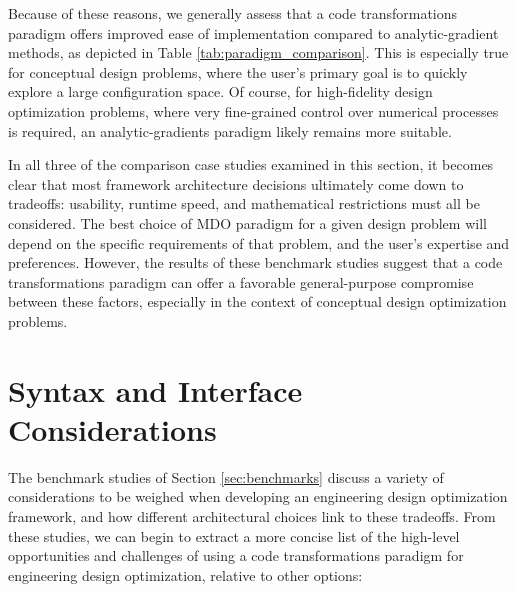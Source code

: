 Because of these reasons, we generally assess that a code transformations paradigm offers improved ease of implementation compared to analytic-gradient methods, as depicted in Table \ref{tab:paradigm_comparison}. This is especially true for conceptual design problems, where the user's primary goal is to quickly explore a large configuration space. Of course, for high-fidelity design optimization problems, where very fine-grained control over numerical processes is required, an analytic-gradients paradigm likely remains more suitable.

In all three of the comparison case studies examined in this section, it becomes clear that most framework architecture decisions ultimately come down to tradeoffs: usability, runtime speed, and mathematical restrictions must all be considered. The best choice of MDO paradigm for a given design problem will depend on the specific requirements of that problem, and the user's expertise and preferences. However, the results of these benchmark studies suggest that a code transformations paradigm can offer a favorable general-purpose compromise between these factors, especially in the context of conceptual design optimization problems.


\section{Syntax and Interface Considerations}
\label{sec:syntax-interface}

The benchmark studies of Section \ref{sec:benchmarks} discuss a variety of considerations to be weighed when developing an engineering design optimization framework, and how different architectural choices link to these tradeoffs. From these studies, we can begin to extract a more concise list of the high-level opportunities and challenges of using a code transformations paradigm for engineering design optimization, relative to other options:

